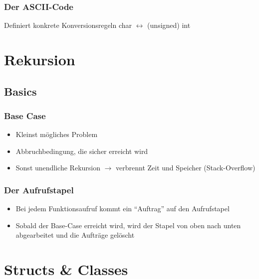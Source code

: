 \documentclass[a3paper, 10pt, landscape]{scrartcl}
\begin{document}
\begin{multicols*}{3}
\begin{tabular}{l l}
	\end{tabular}
	
	
	\subsubsection{Der ASCII-Code}
	\vspace{0.1cm}
	Definiert konkrete Konversionsregeln char $\leftrightarrow$ (unsigned) int
	
	
	


\section{Rekursion}
	
	\subsection{Basics}

	\subsubsection{Base Case}
	\vspace{0.1cm}
	\begin{itemize}
		\item Kleinst mögliches Problem
		\item Abbruchbedingung, die sicher erreicht wird
		\item Sonst unendliche Rekursion $\rightarrow$ verbrennt Zeit und Speicher (Stack-Overflow)
	\end{itemize}
	
	\subsubsection{Der Aufrufstapel}
	\vspace{0.1cm}
	\begin{itemize}
		\item Bei jedem Funktionsaufruf kommt ein "`Auftrag"' auf den Aufrufstapel
		\item Sobald der Base-Case erreicht wird, wird der Stapel von oben nach unten abgearbeitet und die Aufträge gelöscht
	\end{itemize}

\section{Structs \& Classes}


\end{multicols*}
\end{document}
